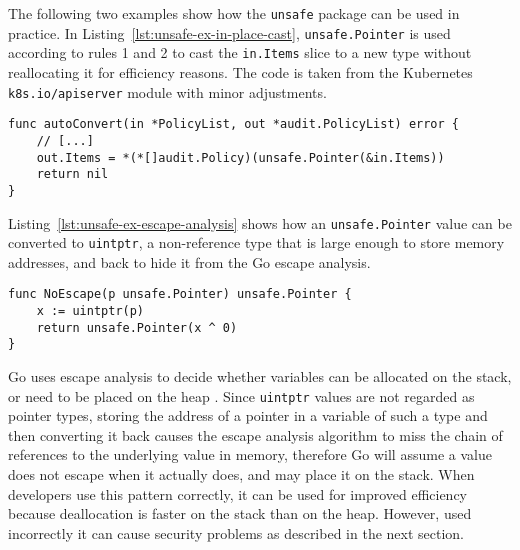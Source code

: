 The following two examples show how the \texttt{unsafe} package can be used in practice.
In Listing~\ref{lst:unsafe-ex-in-place-cast}, \texttt{unsafe.Pointer} is used according to rules 1 and 2 to cast the \texttt{in.Items} slice to a new type without reallocating it for efficiency reasons.
The code is taken from the Kubernetes \texttt{k8s.io/apiserver} module with minor adjustments.

\begin{lstlisting}[language=Golang, label=lst:unsafe-ex-in-place-cast, caption=In-Place Cast using the Unsafe Package]
func autoConvert(in *PolicyList, out *audit.PolicyList) error {
	// [...]
	out.Items = *(*[]audit.Policy)(unsafe.Pointer(&in.Items))
	return nil
}
\end{lstlisting}

Listing~\ref{lst:unsafe-ex-escape-analysis} shows how an \texttt{unsafe.Pointer} value can be converted to \texttt{uintptr}, a non-reference type that is large enough to store memory addresses, and back to hide it from the Go escape analysis.

\begin{lstlisting}[language=Golang, label=lst:unsafe-ex-escape-analysis, caption=Hiding a Value from Escape Analysis]
func NoEscape(p unsafe.Pointer) unsafe.Pointer {
	x := uintptr(p)
	return unsafe.Pointer(x ^ 0)
}
\end{lstlisting}

Go uses escape analysis to decide whether variables can be allocated on the stack, or need to be placed on the heap \cite{wang2020}.
Since \texttt{uintptr} values are not regarded as pointer types, storing the address of a pointer in a variable of such a type and then converting it back causes the escape analysis algorithm to miss the chain of references to the underlying value in memory, therefore Go will assume a value does not escape when it actually does, and may place it on the stack.
When developers use this pattern correctly, it can be used for improved efficiency because deallocation is faster on the stack than on the heap.
However, used incorrectly it can cause security problems as described in the next section.





